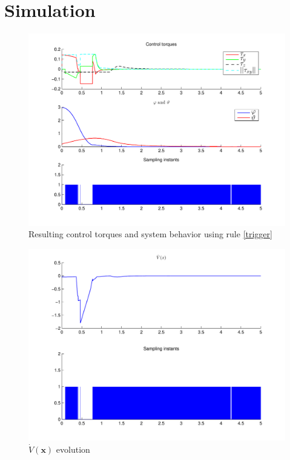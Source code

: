 \documentclass{article}
\begin{document}
	\section{Simulation}
		\begin{figure}[H]
			\centering
			\includegraphics[width=\textwidth]{event1}
			\caption{Resulting control torques and system behavior using rule \eqref{trigger}\label{event_fig}}
		\end{figure}
		
		\begin{figure}[H]
			\centering
			\includegraphics[width=\textwidth]{lyapu}
			\caption{$\dot V(\mathbf{x})$ evolution\label{lyapu_fig}}
		\end{figure}
		
\end{document}

